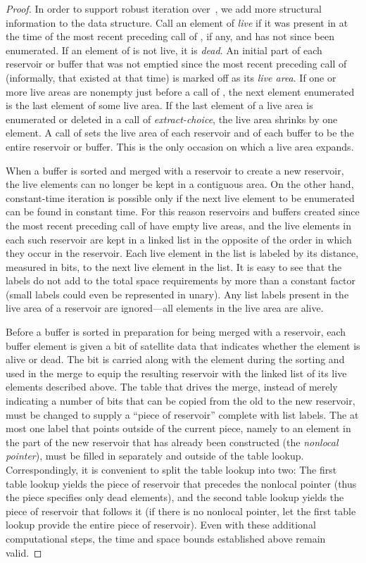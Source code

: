 \documentclass[envcountsame,envcountsect,undated,nolinenumbers]{lnthi}
\def\Tvn#1{\hbox{\textit{#1\/}}}
\begin{document}
\begin{proof}
In order to support robust iteration over~,
we add more structural information to the data structure.
Call an element of  \emph{live} if it was
present in  at the time of the most recent preceding
call of , if any,
and has not since been enumerated.
If an element of  is not live, it is \emph{dead}.
An initial part of each reservoir or buffer
that was not emptied since the most recent preceding call
of 
(informally, that existed at that time)
is marked off as its \emph{live area}.
If one or more live areas are nonempty just before
a call of , the next
element enumerated is the last element of some
live area.
If the last element of a live area is enumerated
or deleted in a call of \Tvn{extract-choice},
the live area shrinks by one element.
A call of  sets the live
area of each reservoir and of each buffer to be the
entire reservoir or buffer.
This is the only occasion on which a live area expands.

When a buffer is sorted and merged with a reservoir
to create a new reservoir, the live elements can
no longer be kept in a contiguous area.
On the other hand, constant-time iteration
is possible only if the next live element
to be enumerated can be found in constant time.
For this reason reservoirs and buffers
created since the most recent preceding call of
 have empty live areas,
and the live elements in each such
reservoir are kept in a linked list in the
opposite of the order in which they occur in the reservoir.
Each live element in the list is labeled by its distance,
measured in bits, to the next live element in the list.
It is easy to see that the labels do not add to
the total space requirements by more than a
constant factor (small labels could even
be represented in unary).
Any list labels present in the live area of
a reservoir are ignored---all elements in
the live area are alive.

Before a buffer is sorted in preparation for being
merged with a reservoir, each buffer element is
given a bit of satellite data that indicates
whether the element is alive or dead.
The bit is carried along with the element during
the sorting and used in the merge to equip the
resulting reservoir with the linked list of its
live elements described above.
The table that drives the merge,
instead of merely indicating a number of bits
that can be copied from the old to the new
reservoir, must be changed to supply a
``piece of reservoir'' complete with list labels.
The at most one label that points outside of
the current piece, namely to an element in
the part of the new reservoir that has already
been constructed
(the \emph{nonlocal pointer}),
must be filled in separately
and outside of the table lookup.
Correspondingly, it is convenient to split
the table lookup into two:
The first table lookup yields the piece of
reservoir that precedes the nonlocal pointer
(thus the piece specifies
only dead elements), and the second table lookup
yields the piece of reservoir that follows it
(if there is no nonlocal pointer, let the
first table lookup
provide the entire piece of reservoir).
Even with these additional computational
steps, the time and
space bounds established above remain valid.


\end{proof}
\end{document}
